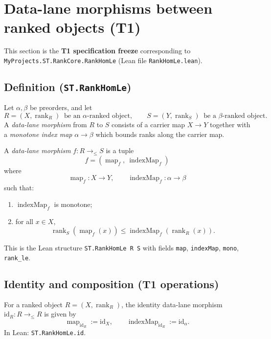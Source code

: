 \section{Data-lane morphisms between ranked objects (T1)}
\label{sec:rankhomle}

This section is the \textbf{T1 specification freeze} corresponding to
\texttt{MyProjects.ST.RankCore.RankHomLe} (Lean file \texttt{RankHomLe.lean}).

\subsection{Definition (\texttt{ST.RankHomLe})}

Let $\alpha,\beta$ be preorders, and let
\[
  R=(X,\operatorname{rank}_R)\ \text{ be an $\alpha$-ranked object}, \qquad
  S=(Y,\operatorname{rank}_S)\ \text{ be a $\beta$-ranked object}.
\]
A \emph{data-lane morphism} from $R$ to $S$ consists of a carrier map $X\to Y$ together with
a \emph{monotone index map} $\alpha\to \beta$ which bounds ranks along the carrier map.

\begin{definition}\label{def:rankhomle}
A \emph{data-lane morphism} $f : R \to_{\le} S$ is a tuple
\[
  f = (\operatorname{map}_f,\ \operatorname{indexMap}_f)
\]
where
\[
  \operatorname{map}_f : X \to Y,\qquad \operatorname{indexMap}_f : \alpha \to \beta
\]
such that:
\begin{enumerate}
\item $\operatorname{indexMap}_f$ is monotone;
\item for all $x\in X$,
\[
  \operatorname{rank}_S(\operatorname{map}_f(x)) \le \operatorname{indexMap}_f(\operatorname{rank}_R(x)).
\]
\end{enumerate}
This is the Lean structure \texttt{ST.RankHomLe R S} with fields
\texttt{map}, \texttt{indexMap}, \texttt{mono}, \texttt{rank\_le}.
\end{definition}

\subsection{Identity and composition (T1 operations)}

\begin{definition}[Identity]\label{def:rankhomle-id}
For a ranked object $R=(X,\operatorname{rank}_R)$, the identity data-lane morphism
$\mathrm{id}_R : R \to_{\le} R$ is given by
\[
  \operatorname{map}_{\mathrm{id}_R} := \mathrm{id}_X,\qquad
  \operatorname{indexMap}_{\mathrm{id}_R} := \mathrm{id}_\alpha.
\]
In Lean: \texttt{ST.RankHomLe.id}.
\end{definition}

